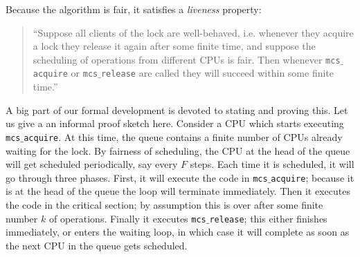 Because the algorithm is fair, it satisfies a \emph{liveness}
property:\begin{quote}
``Suppose all clients of the lock are well-behaved, i.e. whenever they acquire a lock they release it again after some finite time, and suppose the scheduling of operations from different CPUs is fair. Then  whenever \texttt{mcs$\_$acquire} or \texttt{mcs$\_$release} are called they will succeed within some finite time.''
\end{quote}
A big part of our formal development is devoted to stating and proving
this.
Let us give a an informal proof sketch here. 
Consider a CPU which starts executing \texttt{mcs$\_$acquire}.
At this time, the queue contains a finite number of CPUs already waiting for the lock.
By fairness of scheduling, the CPU at the head of the queue will get scheduled periodically, say every $F$ steps. Each time it is scheduled, it will go through three phases. 
First, it will execute the code in \texttt{mcs$\_$acquire}; because it is at the head of the queue the loop will terminate immediately. 
Then it executes the code in the critical section; by assumption this is over after some finite number $k$ of operations. 
Finally it executes \texttt{mcs$\_$release}; this either finishes immediately, or enters the waiting loop, in which case it will complete as soon as the next CPU in the queue gets scheduled. 
